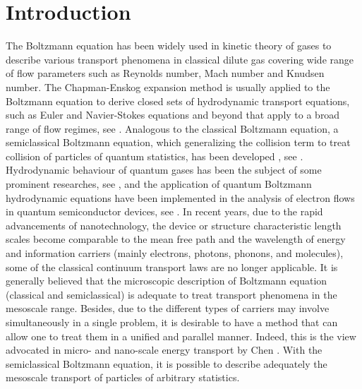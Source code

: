 \documentclass{rsproca}%
\begin{document}



\maketitle

\section{Introduction}
\label{sec:1}

 The Boltzmann equation has been widely used in kinetic theory of gases to describe various transport phenomena in classical dilute gas covering wide range of flow parameters such as Reynolds number, Mach number and Knudsen number.   The Chapman-Enskog expansion method is usually applied to the Boltzmann equation to derive closed sets of hydrodynamic transport equations, such as Euler and Navier-Stokes equations and beyond that apply to a broad range of flow regimes, see \cite{Cowling1970}.  Analogous to the classical Boltzmann equation, a semiclassical Boltzmann equation, which generalizing the collision term to treat collision of particles of quantum statistics, has been developed \cite{PhysRev.43.552}, see \cite{KadanoffBaym,PhysRev.43.552}.   Hydrodynamic behaviour of quantum gases has been the subject of some prominent researches, see \cite{nikuni98,PhysRev.40.749,PhysRevB.35.7959}, and the application of quantum Boltzmann hydrodynamic equations have been implemented in the analysis of electron flows in quantum semiconductor devices, see \cite{Gardner1994,PhysRevB.39.9536,Woolard5146296}.
In recent years, due to the rapid advancements of nanotechnology, the device or structure characteristic length scales become comparable to the mean free path and the wavelength of energy and information carriers (mainly electrons, photons, phonons, and molecules), some of the classical continuum transport laws are no longer applicable.   It is generally believed that the microscopic description of Boltzmann equation (classical and semiclassical) is adequate to treat transport phenomena in the mesoscale range.  Besides, due to the different types of carriers may involve simultaneously in a single problem, it is desirable to have a method that can allow one to treat them in a unified and parallel manner.   Indeed, this is the view advocated in micro- and nano-scale energy transport by Chen \cite{mit2005nanoscale}.   With the semiclassical Boltzmann equation, it is possible to describe adequately the mesoscale transport of particles of arbitrary statistics.
\end{document}
